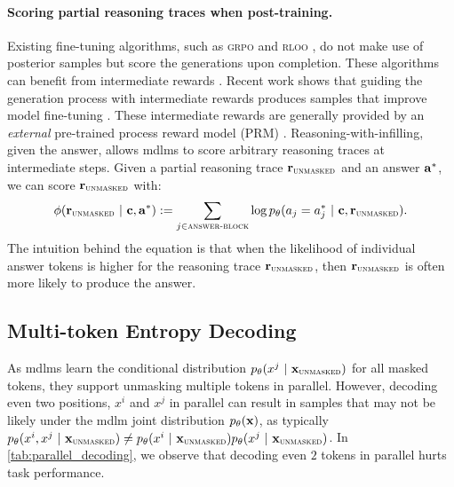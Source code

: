 \paragraph{Scoring partial reasoning traces when post-training.} 
Existing fine-tuning algorithms, such as \textsc{grpo} \citep{shao2024deepseekmath} and \textsc{rloo} \citep{ahmadian2024back}, do not make use of posterior samples but score the generations upon completion. These algorithms can benefit from intermediate rewards \citep{silver2016mastering}. Recent work shows that guiding the generation process with intermediate rewards produces samples that improve model fine-tuning \citep{zhang2024rest}. These intermediate rewards are generally provided by an \textit{external} pre-trained process reward model (PRM) \citep{lightman2023letsverifystepstep,zhang2024rest, zhang2025lessonsdevelopingprocessreward}. Reasoning-with-infilling, given the answer, allows \glspl{mdlm} to {score} arbitrary reasoning traces at {intermediate} steps. Given a partial reasoning trace $\mathbf{r}_{\textsc{unmasked}}$ and an answer $\mathbf{a}^*$, we can score $\mathbf{r}_{\textsc{unmasked}}$ with:
\begin{align}
    \phi(\mathbf{r}_{\textsc{unmasked}} ~\vert~ \mathbf{c}, \mathbf{a}^*) := \sum_{j \in \textsc{answer-block}} \log p_\theta(a_j = a_j^* ~\vert~ \mathbf{c}, \mathbf{r}_{\textsc{unmasked}}) .
\end{align}
The intuition behind the equation is that when the likelihood of individual answer tokens is higher for the reasoning trace $\mathbf{r}_{\textsc{unmasked}}$, then $\mathbf{r}_{\textsc{unmasked}}$ is often more likely to produce the answer. 






















\subsection{Multi-token Entropy Decoding}
As \glspl{mdlm} learn the conditional distribution $p_\theta(x^j ~\vert~ \mathbf{x}_{\textsc{unmasked}})$ for all masked tokens, they support unmasking multiple tokens in parallel. However, decoding even two positions, $x^i$ and $x^j$ in parallel can result in samples that may not be likely under the \gls{mdlm} joint distribution $p_\theta(\mathbf{x})$, as typically $p_\theta(x^i, x^j ~\vert~ \mathbf{x}_{\textsc{unmasked}}) \neq p_\theta(x^i ~\vert~ \mathbf{x}_{\textsc{unmasked}}) p_\theta(x^j ~\vert~ \mathbf{x}_{\textsc{unmasked}})$. In \cref{tab:parallel_decoding}, we observe that decoding even $2$ tokens in parallel hurts task performance.


